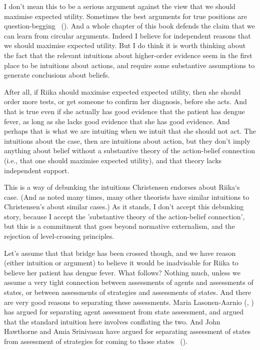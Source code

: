 \documentclass[
  10pt,
  letterpaper,
  twoside]{scrbook}
\begin{document}
I don't mean this to be a serious argument against the view that we
should maximise expected utility. Sometimes the best arguments for true
positions are question-begging ~().
And a whole chapter of this book defends the claim that we can learn
from circular arguments. Indeed I believe for independent reasons that
we should maximise expected utility. But I do think it is worth thinking
about the fact that the relevant intuitions about higher-order evidence
seem in the first place to be intuitions about actions, and require some
substantive assumptions to generate conclusions about beliefs.

After all, if {Riika} should maximise expected expected utility, then
she should order more tests, or get someone to confirm her diagnosis,
before she acts. And that is true even if she actually has good evidence
that the patient has dengue fever, as long as she lacks good evidence
that she has good evidence. And perhaps that is what we are intuiting
when we intuit that she should not act. The intuitions about the case,
then are intuitions about action, but they don't imply anything about
belief without a substantive theory of the action-belief connection
(i.e., that one should maximise expected utility), and that theory lacks
independent support.

This is a way of debunking the intuitions Christensen endorses about
{Riika}`s case. (And as noted many times, many other theorists have
similar intuitions to Christensen's about similar cases.) As it stands,
I don't accept this debunking story, because I accept the 'substantive
theory of the action-belief connection', but this is a commitment that
goes beyond normative externalism, and the rejection of level-crossing
principles.

Let's assume that that bridge has been crossed though, and we have
reason (either intuition or argument) to believe it would be inadvisable
for {Riika} to believe her patient has dengue fever. What follows?
Nothing much, unless we assume a very tight connection between
assessments of agents and assessments of states, or between assessments
of strategies and assessments of states. And there are very good reasons
to separating these assessments. Maria Lasonen-Aarnio
(,
) has argued for separating
agent assessment from state assessment, and argued that the standard
intuition here involves conflating the two. And John Hawthorne and Amia
Srinivasan have argued for separating assessment of states from
assessment of strategies for coming to those states
~().
\end{document}
